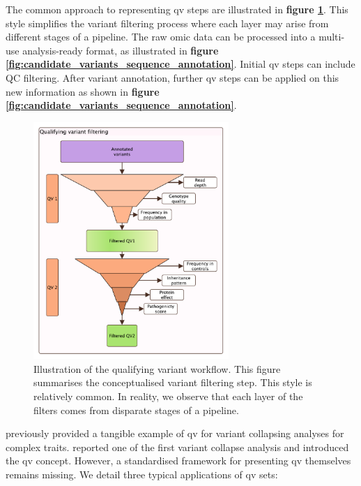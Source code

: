 The common approach to representing \ac{qv} steps are illustrated in 
\textbf{figure \ref{fig:qv_filter_pyramid_vcurrent}}.
This style simplifies the variant filtering process where each layer may arise from different stages of a pipeline.
The raw omic data can be processed into a multi-use analysis-ready format, as illustrated in 
\textbf{figure 
\ref{fig:candidate_variants_sequence_annotation}}.
Initial \ac{qv} steps can include QC filtering. 
After variant annotation, further \ac{qv} steps can be applied on this new information as shown in 
\textbf{figure
\ref{fig:candidate_variants_sequence_annotation}}.
 
\begin{figure}
\centering
     \includegraphics[width=0.66\textwidth]{./images/qv_filter_pyramid_vcurrent.pdf}
\caption{Illustration of the qualifying variant workflow. This figure summarises the conceptualised variant filtering step. This style is relatively common. In reality, we observe that each layer of the filters comes from disparate stages of a pipeline.}
    \label{fig:qv_filter_pyramid_vcurrent}
\end{figure}

\citet{povysil2019rare} previously provided a tangible example of \ac{qv} for variant collapsing analyses for complex traits. 
\citet{cirulli2015exome} reported one of the first variant collapse analysis and introduced the \ac{qv} concept.
However, a standardised framework for presenting \ac{qv} themselves remains missing. 
We detail three typical applications of \ac{qv} sets:

